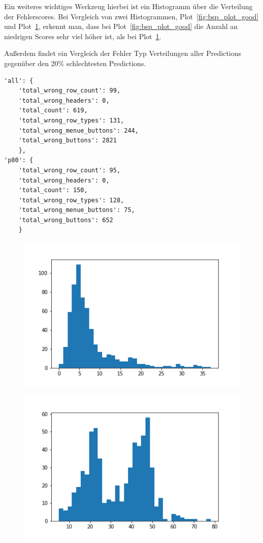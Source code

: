 \documentclass[pdftex,a4paper,halfparskip, article]{scrartcl}
\begin{document}
Ein weiteres wichtiges Werkzeug hierbei ist ein Histogramm über die Verteilung der Fehlerscores. Bei Vergleich von zwei Histogrammen, Plot~\ref{fig:bsp_plot_good} und Plot~\ref{fig:bsp_plot_bad}, erkennt man, dass bei Plot~\ref{fig:bsp_plot_good} die Anzahl an niedrigen Scores sehr viel höher ist, als bei Plot~\ref{fig:bsp_plot_bad}.

Außerdem findet ein Vergleich der Fehler Typ Verteilungen aller Predictions gegenüber den 20\% schlechtesten Predictions.

\begin{verbatim}
'all': {
    'total_wrong_row_count': 99,
    'total_wrong_headers': 0, 
    'total_count': 619, 
    'total_wrong_row_types': 131, 
    'total_wrong_menue_buttons': 244, 
    'total_wrong_buttons': 2821
    },
'p80': {
    'total_wrong_row_count': 95, 
    'total_wrong_headers': 0, 
    'total_count': 150, 
    'total_wrong_row_types': 128, 
    'total_wrong_menue_buttons': 75, 
    'total_wrong_buttons': 652
    }
\end{verbatim}

\begin{figure}
\centering
\begin{minipage}{.5\textwidth}
  \centering
  \includegraphics[width=.8\linewidth]{predictions_bin10_histogramm}
  \label{fig:bsp_plot_good}
\end{minipage}%
\begin{minipage}{.5\textwidth}
  \centering
  \includegraphics[width=.8\linewidth]{predictions_bin12_histogramm}
  \label{fig:bsp_plot_bad}
\end{minipage}
\end{figure}
\end{document}
